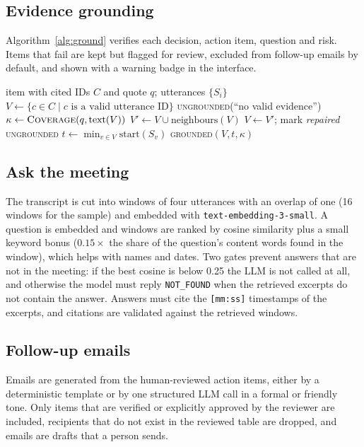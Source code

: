 \documentclass[conference]{IEEEtran}
\begin{document}
\subsection{Evidence grounding}
Algorithm~\ref{alg:ground} verifies each decision, action item, question and risk. Items that fail are kept but flagged for
review, excluded from follow-up emails by default, and shown with a warning badge in the interface.

\begin{algorithm}[t]
\caption{Evidence grounding of one minutes item}
\label{alg:ground}
\begin{algorithmic}[1]
\Require item with cited IDs $C$ and quote $q$; utterances $\{S_i\}$
\State $V \gets \{c \in C \mid c \text{ is a valid utterance ID}\}$
 \State \Return \textsc{ungrounded}(``no valid evidence'') \EndIf
\State $\kappa \gets \textsc{Coverage}(q, \text{text}(V))$ 
  \State $V' \gets V \cup \text{neighbours}(V)$ 
   \State $V \gets V'$; mark \emph{repaired} \Else \State \Return \textsc{ungrounded} \EndIf
\EndIf
\State $t \gets \min_{v \in V} \text{start}(S_v)$ 
\State \Return \textsc{grounded}$(V, t, \kappa)$
\end{algorithmic}
\end{algorithm}

\subsection{Ask the meeting}
The transcript is cut into windows of four utterances with an overlap of one (16 windows for the sample) and embedded with
\texttt{text-embedding-3-small}. A question is embedded and windows are ranked by cosine similarity plus a small keyword bonus
($0.15\times$ the share of the question's content words found in the window), which helps with names and dates. Two gates
prevent answers that are not in the meeting: if the best cosine is below 0.25 the LLM is not called at all, and otherwise the
model must reply \texttt{NOT\_FOUND} when the retrieved excerpts do not contain the answer. Answers must cite the
\texttt{[mm:ss]} timestamps of the excerpts, and citations are validated against the retrieved windows.

\subsection{Follow-up emails}
Emails are generated from the human-reviewed action items, either by a deterministic template or by one structured LLM call in a
formal or friendly tone. Only items that are verified or explicitly approved by the reviewer are included, recipients that do
not exist in the reviewed table are dropped, and emails are drafts that a person sends.
\end{document}
